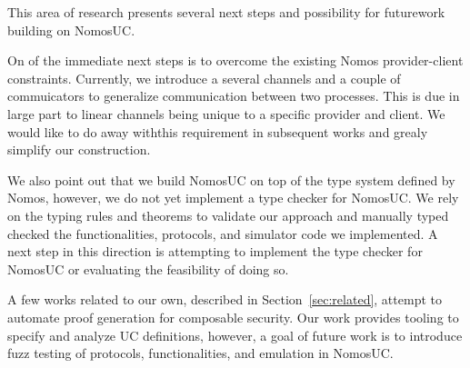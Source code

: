 This area of research presents several next steps and possibility for futurework building on NomosUC.

On of the immediate next steps is to overcome the existing Nomos provider-client constraints. 
Currently, we introduce a several channels and a couple of commuicators to generalize communication between two processes. 
This is due in large part to linear channels being unique to a specific provider and client.
We would like to do away withthis requirement in subsequent works and grealy simplify our construction.

We also point out that we build NomosUC on top of the type system defined by Nomos, however, we do not yet implement a type checker for NomosUC. We rely on the typing rules and theorems to validate our approach and manually typed checked the functionalities, protocols, and simulator code we implemented.
A next step in this direction is attempting to implement the type checker for NomosUC or evaluating the feasibility of doing so.

A few works related to our own, described in Section~\ref{sec:related}, attempt to automate proof generation for composable security. Our work provides tooling to specify and analyze UC definitions, however, a goal of future work is to introduce fuzz testing of protocols, functionalities, and emulation in NomosUC.


